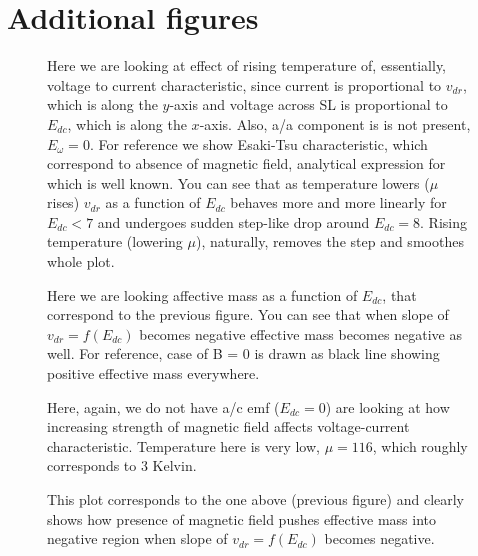 \documentclass[40pt,letterpaper,physrev]{article}
\begin{document}
    \section{Additional figures}
	\begin{figure}[H]
	  \centering
	  \normalsize
	  
	  \label{fig:v_dr_of_E_dc_B=4_different_mu}
	  \caption{Here we are looking at effect of rising temperature of, essentially, voltage to current characteristic,
	  since current is proportional to $v_{dr}$, which is along the $y$-axis and voltage across SL is proportional to 
	  $E_{dc}$, which is along the $x$-axis. Also, a/a component is is not present, $E_{\omega} = 0$. For reference we
	  show Esaki-Tsu characteristic, which correspond to absence of magnetic field, analytical expression for which
	  is well known. You can see that as temperature lowers ($\mu$ rises) $v_{dr}$ as a function of $E_{dc}$ behaves
	  more and more linearly for $E_{dc} < 7$ and undergoes sudden step-like drop around $E_{dc} = 8$. Rising temperature
	  (lowering $\mu$), naturally, removes the step and smoothes whole plot.}
	\end{figure}
	\newpage
	\begin{figure}[H]
	  \centering
	  \normalsize
	  
	  \label{fig:effect1ive_mass_of_E_dc_B=4_different_mu}
	  \caption{Here we are looking affective mass as a function of $E_{dc}$, that correspond to the previous figure. 
	  You can see that when slope of $v_{dr} = f(E_{dc})$ becomes negative effective mass becomes negative as well. 
	  For reference, case of B = 0 is drawn as black line showing positive effective mass everywhere.}
	\end{figure}
	\newpage
	\begin{figure}[H]
	  \centering
	  \normalsize %
	  
	  \label{fig:v_dr_of_E_dc_different_B}
	  \caption{Here, again, we do not have a/c emf ($E_{dc} = 0$) are looking at how increasing strength of magnetic field
affects voltage-current characteristic. Temperature here is very low, $\mu = 116$, which roughly corresponds 
to 3 Kelvin.}
	\end{figure}
	\newpage
	\begin{figure}[H]
	  \centering
	  \normalsize %
	  
	  \label{fig:effect1ive_mass_of_E_dc_different_B}
	  \caption{This plot corresponds to the one above (previous figure) and clearly shows how presence of magnetic field
	  pushes effective mass into negative region when slope of $v_{dr} = f(E_{dc})$ becomes negative.}
	\end{figure}
\end{document}
